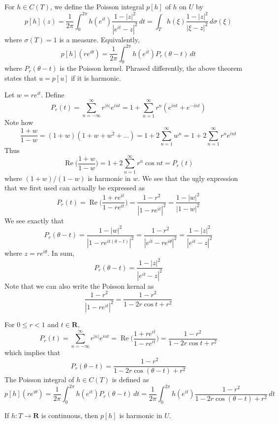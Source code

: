 \vspace{2ex}
\begin{defi}
For $h\in C(T)$, we define the Poisson integral $p[h]$ of $h$ on $U$ by 
\[p[h](z)=\dfrac{1}{2\pi }\int ^{2\pi }_{0}h(e^{it})\dfrac{1-|z|^2}{|e^{it}-z|^2}\,dt=\int _{T}h(\xi )\dfrac{1-|z|^2}{|\xi -z|^2}\,d\sigma (\xi )\]
where $\sigma(T)=1$ is a measure. Equivalently,
\[p[h](re^{i\theta })=\dfrac{1}{2\pi }\int ^{2\pi }_{0}h(e^{it})P_{r}(\theta -t)\,dt\]
where $P_{r}(\theta -t)$ is the Poisson kernel. Phrased differently, the above theorem states that $u=p[u]$ if it is harmonic. 
\end{defi}
\vspace{2ex}
\begin{defi}
Let $w=re^{it}$. Define
\[P_{r}(t)=\sum ^{\infty }_{n=-\infty }r^{|n|}e^{int }=1+\sum ^{\infty }_{n=1}r^{n}(e^{int}+e^{-in t})\]
Note how
\[\dfrac{1+w}{1-w}=(1+w)(1+w+w^2+\ldots )=1+2\sum ^{\infty }_{n=1}w^{n}=1+2\sum ^{\infty }_{n=1}r^{n}e^{in t}\]
Thus
\[\mathop{\mathrm{Re}}\Big(\dfrac{1+w}{1-w}\Big)=1+2\sum ^{\infty }_{n=1}r^{n}\cos nt=P_{r}(t)\]
where $(1+w)/(1-w)$ is harmonic in $w$. We see that the ugly expression that we first used can actually be expressed as 
\[P_{r}(t)=\mathop{\mathrm{Re}}\Big(\dfrac{1+re^{it}}{1-re^{it}}\Big)=\dfrac{1-r^2}{|1-re^{it}|^2}=\dfrac{1-|w|^2}{|1-w|^2}\]
We see exactly that 
\[P_{r}(\theta -t)=\dfrac{1-|w|^2}{|1-re^{it(\theta -t)}|^2}=\dfrac{1-r^2}{|e^{it}-re^{i\theta }|^2}=\dfrac{1-|z|^2}{|e^{it}-z|^2}\]
where $z=re^{i\theta }$. In sum, 
\[P_{r}(\theta -t)=\dfrac{1-|z|^2}{|e^{it}-z|^2}\]
Note that we can also write the Poisson kernal as 
\[\dfrac{1-r^2}{|1-re^{it}|^2}=\dfrac{1-r^2}{1-2r\cos t+r^2}\]
\end{defi}
\vspace{2ex}
\begin{thm}
For $0\leq r<1$ and $t\in {\bm R}$,
\[P_{r}(t)=\sum ^{\infty }_{n=-\infty }r^{|n|}e^{in t}=\mathop{\mathrm{Re}}\Big(\dfrac{1+re^{it}}{1-re^{it}}\Big)=\dfrac{1-r^2}{1-2r\cos t+r^2}\]
which implies that
\[P_{r}(\theta -t)=\dfrac{1-r^2}{1-2r\cos (\theta -t)+r^2}\]
The Poisson integral of $h\in C(T)$ is defined as 
\[p[h](re^{i\theta })=\dfrac{1}{2\pi }\int ^{2\pi }_{0}h(e^{it})P_{r}(\theta -t)\,dt=\dfrac{1}{2\pi }\int ^{2\pi }_{0}h(e^{it})\dfrac{1-r^2}{1-2r\cos (\theta -t)+r^2}\,dt\]
\end{thm}
\vspace{2ex}
\begin{thm}
If $h:T\rightarrow {\bm R}$ is continuous, then $p[h]$ is harmonic in $U$. 
\end{thm}
